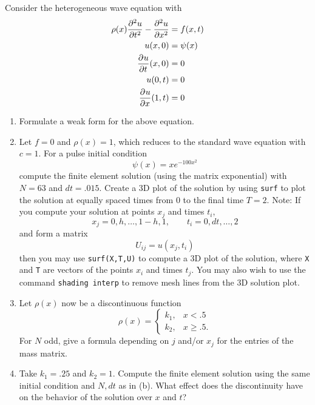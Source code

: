 Consider the heterogeneous wave equation with 
\begin{align*}
\rho(x)\frac{\partial^{2} u}{\partial t^{2}} - \frac{\partial^{2} u}{\partial x^{2}} &= f(x,t)\\
u(x,0) &= \psi(x)\\
\frac{\partial^{} u}{\partial t^{}}(x,0) &= 0\\
u(0,t) &= 0\\
\frac{\partial^{} u}{\partial x^{}}(1,t) &= 0
\end{align*}
\begin{enumerate}
In seismic imaging problems (i.e. sonar, radar, finding oil, etc), the wave equation can be used to simulate a sound wave propagating in the $x$ direction through a medium.  Here, we assume $\rho(x)$ is the density of the medium, and that it only changes in the direction of propagation.  

\item Formulate a weak form for the above equation.  
\item Let $f= 0$ and $\rho(x) = 1$, which reduces to the standard wave equation with $c=1$.  For a pulse initial condition 
\[
\psi(x) = xe^{-100x^2}
\]
compute the finite element solution (using the matrix exponential) with $N = 63$ and $dt = .015$.  Create a 3D plot of the solution by using \verb+surf+ to plot the solution at equally spaced times from 0 to the final time $T = 2$.  Note: If you compute your solution at points $x_j$ and times $t_i$,
\[
x_j = 0, h, \ldots, 1-h, 1, \qquad t_i = 0, dt, \ldots, 2
\]
and form a matrix
\[
U_{ij} = u(x_j,t_i)
\]
then you may use \verb+surf(X,T,U)+ to compute a 3D plot of the solution, where \verb+X+ and \verb+T+ are vectors of the points $x_i$ and times $t_j$.  You may also wish to use the command \verb+shading interp+ to remove mesh lines from the 3D solution plot.  

\item Let $\rho(x)$ now be a discontinuous function
\[
\rho(x) = \begin{cases}
k_1, & x < .5\\
k_2, & x \geq .5.
\end{cases}
\]
For $N$ odd, give a formula depending on $j$ and/or $x_j$ for the entries of the mass matrix.  
\item Take $k_1 = .25$ and $k_2 = 1$.  Compute the finite element solution using the same initial condition and $N, dt$ as in (b).  What effect does the discontinuity have on the behavior of the solution over $x$ and $t$?  
\end{enumerate}

